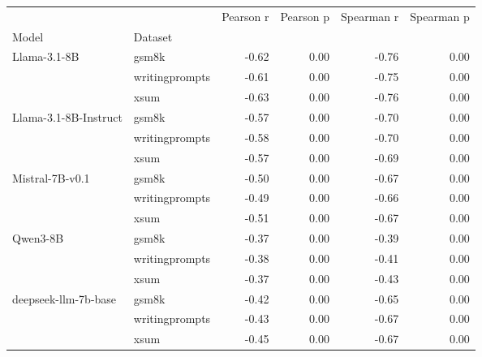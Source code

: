 \begin{tabular}{llrrrr}
\toprule
 &  & Pearson r & Pearson p & Spearman r & Spearman p \\
Model & Dataset &  &  &  &  \\
\midrule
\multirow[t]{3}{*}{Llama-3.1-8B} & gsm8k & -0.62 & 0.00 & -0.76 & 0.00 \\
 & writingprompts & -0.61 & 0.00 & -0.75 & 0.00 \\
 & xsum & -0.63 & 0.00 & -0.76 & 0.00 \\
\cline{1-6}
\multirow[t]{3}{*}{Llama-3.1-8B-Instruct} & gsm8k & -0.57 & 0.00 & -0.70 & 0.00 \\
 & writingprompts & -0.58 & 0.00 & -0.70 & 0.00 \\
 & xsum & -0.57 & 0.00 & -0.69 & 0.00 \\
\cline{1-6}
\multirow[t]{3}{*}{Mistral-7B-v0.1} & gsm8k & -0.50 & 0.00 & -0.67 & 0.00 \\
 & writingprompts & -0.49 & 0.00 & -0.66 & 0.00 \\
 & xsum & -0.51 & 0.00 & -0.67 & 0.00 \\
\cline{1-6}
\multirow[t]{3}{*}{Qwen3-8B} & gsm8k & -0.37 & 0.00 & -0.39 & 0.00 \\
 & writingprompts & -0.38 & 0.00 & -0.41 & 0.00 \\
 & xsum & -0.37 & 0.00 & -0.43 & 0.00 \\
\cline{1-6}
\multirow[t]{3}{*}{deepseek-llm-7b-base} & gsm8k & -0.42 & 0.00 & -0.65 & 0.00 \\
 & writingprompts & -0.43 & 0.00 & -0.67 & 0.00 \\
 & xsum & -0.45 & 0.00 & -0.67 & 0.00 \\
\cline{1-6}
\bottomrule
\end{tabular}
